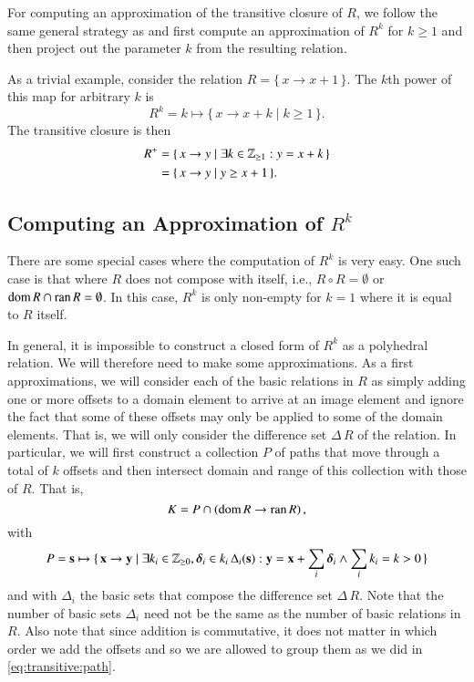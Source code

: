 For computing an approximation of the transitive closure of $R$,
we follow the same general strategy as 
and first compute an approximation of $R^k$ for $k \ge 1$ and then project
out the parameter $k$ from the resulting relation.

\begin{example}
As a trivial example, consider the relation
$R = \{\, x \to x + 1 \,\}$.  The $k$th power of this map
for arbitrary $k$ is
$$
R^k = k \mapsto \{\, x \to x + k \mid k \ge 1 \,\}
.
$$
The transitive closure is then
$$
\begin{aligned}
R^+ & = \{\, x \to y \mid \exists k \in \mathbb{Z}_{\ge 1} : y = x + k \,\}
\\
& = \{\, x \to y \mid y \ge x + 1 \,\}
.
\end{aligned}
$$
\end{example}

\subsection{Computing an Approximation of $R^k$}
\label{s:power}

There are some special cases where the computation of $R^k$ is very easy.
One such case is that where $R$ does not compose with itself,
i.e., $R \circ R = \emptyset$ or $\mathop{\rm dom}\nolimits R \cap \mathop{\rm ran}\nolimits R = \emptyset$.
In this case, $R^k$ is only non-empty for $k=1$ where it is equal
to $R$ itself.

In general, it is impossible to construct a closed form
of $R^k$ as a polyhedral relation.
We will therefore need to make some approximations.
As a first approximations, we will consider each of the basic
relations in $R$ as simply adding one or more offsets to a domain element
to arrive at an image element and ignore the fact that some of these
offsets may only be applied to some of the domain elements.
That is, we will only consider the difference set $\Delta\,R$ of the relation.
In particular, we will first construct a collection $P$ of paths
that move through
a total of $k$ offsets and then intersect domain and range of this
collection with those of $R$.
That is, 
\begin{equation}
\label{eq:transitive:approx}
K = P \cap \left(\mathop{\rm dom}\nolimits R \to \mathop{\rm ran}\nolimits R\right)
,
\end{equation}
with
\begin{equation}
\label{eq:transitive:path}
P = \vec s \mapsto \{\, \vec x \to \vec y \mid
\exists k_i \in \Z_{\ge 0}, \vec\delta_i \in k_i \, \Delta_i(\vec s) :
\vec y = \vec x + \sum_i \vec\delta_i
\wedge
\sum_i k_i = k > 0
\,\}
\end{equation}
and with $\Delta_i$ the basic sets that compose
the difference set $\Delta\,R$.
Note that the number of basic sets $\Delta_i$ need not be
the same as the number of basic relations in $R$.
Also note that since addition is commutative, it does not
matter in which order we add the offsets and so we are allowed
to group them as we did in \eqref{eq:transitive:path}.

